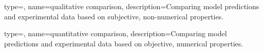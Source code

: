 {
type=\thisgls,
name={qualitative comparison},
description={Comparing model predictions and experimental data based on subjective, non-numerical properties.}
}

{
type=\thisgls,
name={quantitative comparison},
description={Comparing model predictions and experimental data based on objective, numerical properties.}
}


